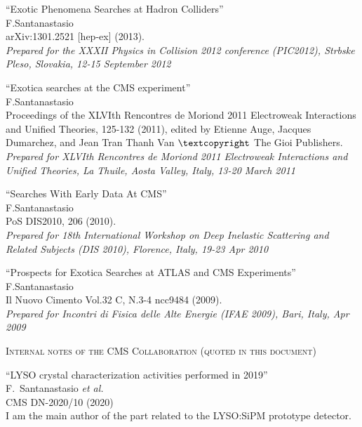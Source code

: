 \documentclass[10pt, a4paper]{article}
\begin{document}
\begin{thebibliography}{599}
  ``Exotic Phenomena Searches at Hadron Colliders''\\
 F.Santanastasio\\
  arXiv:1301.2521 [hep-ex] (2013).\\
  {\it Prepared for the XXXII Physics in Collision 2012 conference (PIC2012), Strbske Pleso, Slovakia, 12-15 September 2012}

``Exotica searches at the CMS experiment''\\
 F.Santanastasio\\
  Proceedings of the XLVIth Rencontres de Moriond 2011 Electroweak Interactions and Unified Theories, 125-132 (2011), edited by Etienne Auge, Jacques Dumarchez, and Jean Tran Thanh Van $\textcopyright$ The Gioi Publishers.\\
{\it Prepared for XLVIth Rencontres de Moriond 2011 Electroweak Interactions and Unified Theories, La Thuile, Aosta Valley, Italy, 13-20 March 2011}

``Searches With Early Data At CMS''\\
 F.Santanastasio\\
  PoS DIS2010, 206 (2010).\\
  {\it Prepared for 18th International Workshop on Deep Inelastic Scattering and Related Subjects (DIS 2010), Florence, Italy, 19-23 Apr 2010}

``Prospects for Exotica Searches at ATLAS and CMS Experiments''\\
 F.Santanastasio\\
Il Nuovo Cimento Vol.32 C, N.3-4 ncc9484 (2009).\\
{\it Prepared for Incontri di Fisica delle Alte Energie (IFAE 2009), Bari, Italy, Apr 2009}

\vspace{0.1cm} \begin{center} \textsc{Internal notes of the CMS
    Collaboration (quoted in this document)} \end{center} \vspace{0.05cm}

``LYSO crystal characterization activities performed in 2019''
  \\{}F.~Santanastasio {\it et al.}
  \\{}CMS DN-2020/10 (2020)
  \\ I am the main author of the part related to the LYSO:SiPM prototype detector.


\end{thebibliography}
\end{document}
